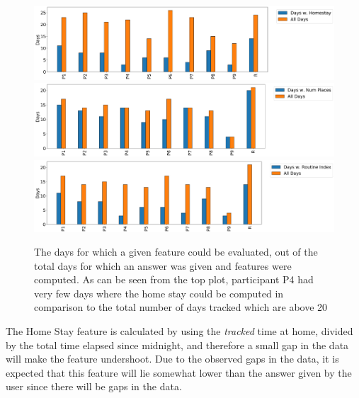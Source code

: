\begin{figure}[h]
    \centering
    \includegraphics[width=\textwidth]{images/study/homestay_valid_days.png}
    \includegraphics[width=\textwidth]{images/study/numplaces_valid_days.png}
    \includegraphics[width=\textwidth]{images/study/routine_valid_days.png}
    \caption{The days for which a given feature could be evaluated, out of the total days for which an answer was given and features were computed. As can be seen from the top plot, participant P4 had very few days where the home stay could be computed in comparison to the total number of days tracked which are above 20}
    \label{fig:plot-daily}
\end{figure}

The Home Stay feature is calculated by using the \textit{tracked} time at home, divided by the total time elapsed since midnight, and therefore a small gap in the data will make the feature undershoot. Due to the observed gaps in the data, it is expected that this feature will lie somewhat lower than the answer given by the user since there will be gaps in the data. \\

